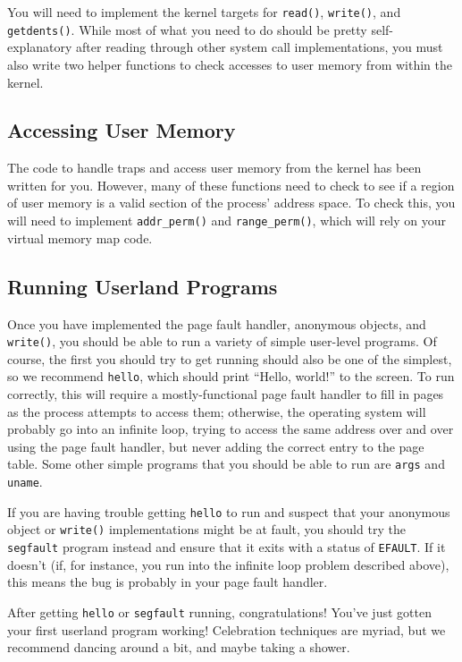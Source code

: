 You will need to implement the kernel targets for \texttt{read()}, \texttt{write()}, and \texttt{getdents()}. While most of what you need to do should be pretty self-explanatory after reading through other system call implementations, you must also write two helper functions to check accesses to user memory from within the kernel.

\subsection{Accessing User Memory}

The code to handle traps and access user memory from the kernel has been written for you. However, many of these functions need to check to see if a region of user memory is a valid section of the process' address space. To check this, you will need to implement \texttt{addr\_perm()} and \texttt{range\_perm()}, which will rely on your virtual memory map code.

\subsection{Running Userland Programs}

Once you have implemented the page fault handler, anonymous objects, and \texttt{write()}, you should be able to run a variety of simple user-level programs. Of course, the first you should try to get running should also be one of the simplest, so we recommend \texttt{hello}, which should print ``Hello, world!'' to the screen. To run correctly, this will require a mostly-functional page fault handler to fill in pages as the process attempts to access them; otherwise, the operating system will probably go into an infinite loop, trying to access the same address over and over using the page fault handler, but never adding the correct entry to the page table. Some other simple programs that you should be able to run are \texttt{args} and \texttt{uname}.

If you are having trouble getting \texttt{hello} to run and suspect that your anonymous object or \texttt{write()} implementations might be at fault, you should try the \texttt{segfault} program instead and ensure that it exits with a status of \texttt{EFAULT}. If it doesn't (if, for instance, you run into the infinite loop problem described above), this means the bug is probably in your page fault handler.

After getting \texttt{hello} or \texttt{segfault} running, congratulations! You've just gotten your first userland program working! Celebration techniques are myriad, but we recommend dancing around a bit, and maybe taking a shower.

